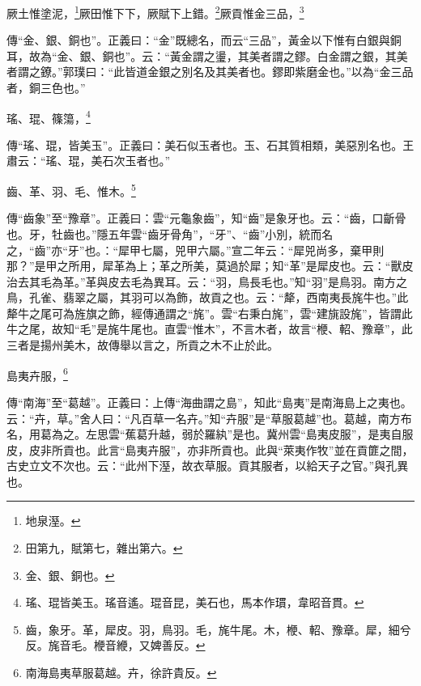 厥土惟塗泥，\footnote{地泉溼。}厥田惟下下，厥賦下上錯。\footnote{田第九，賦第七，雜出第六。}厥貢惟金三品，\footnote{金、銀、銅也。}

{\noindent\zhuan{}\fzbyks 傳“金、銀、銅也”。正義曰：“金”既總名，而云“三品”，黃金以下惟有白銀與銅耳，故為“金、銀、銅也”。云：“黃金謂之璗，其美者謂之鏐。白金謂之銀，其美者謂之鐐。”郭璞曰：“此皆道金銀之別名及其美者也。鏐即紫磨金也。”以為“金三品者，銅三色也。” \par}

瑤、琨、篠簜，\footnote{瑤、琨皆美玉。瑤音遙。琨音昆，美石也，馬本作瑻，韋昭音貫。}

{\noindent\zhuan{}\fzbyks 傳“瑤、琨，皆美玉”。正義曰：美石似玉者也。玉、石其質相類，美惡別名也。王肅云：“瑤、琨，美石次玉者也。” \par}

齒、革、羽、毛、惟木。\footnote{齒，象牙。革，犀皮。羽，鳥羽。毛，旄牛尾。木，楩、軺、豫章。犀，細兮反。旄音毛。楩音緶，又婢善反。}

{\noindent\zhuan{}\fzbyks 傳“齒象”至“豫章”。正義曰：雲“元龜象齒”，知“齒”是象牙也。云：“齒，口齗骨也。牙，牡齒也。”隱五年雲“齒牙骨角”，“牙”、“齒”小別，統而名之，“齒”亦“牙”也。：“犀甲七屬，兕甲六屬。”宣二年云：“犀兕尚多，棄甲則那？”是甲之所用，犀革為上；革之所美，莫過於犀；知“革”是犀皮也。云：“獸皮治去其毛為革。”革與皮去毛為異耳。云：“羽，鳥長毛也。”知“羽”是鳥羽。南方之鳥，孔雀、翡翠之屬，其羽可以為飾，故貢之也。云：“犛，西南夷長旄牛也。”此犛牛之尾可為旌旗之飾，經傳通謂之“旄”。雲“右秉白旄”，雲“建旐設旄”，皆謂此牛之尾，故知“毛”是旄牛尾也。直雲“惟木”，不言木者，故言“楩、軺、豫章”，此三者是揚州美木，故傳舉以言之，所貢之木不止於此。 \par}

島夷卉服，\footnote{南海島夷草服葛越。卉，徐許貴反。}

{\noindent\zhuan{}\fzbyks 傳“南海”至“葛越”。正義曰：上傳“海曲謂之島”，知此“島夷”是南海島上之夷也。云：“卉，草。”舍人曰：“凡百草一名卉。”知“卉服”是“草服葛越”也。葛越，南方布名，用葛為之。左思雲“蕉葛升越，弱於羅紈”是也。冀州雲“島夷皮服”，是夷自服皮，皮非所貢也。此言“島夷卉服”，亦非所貢也。此與“萊夷作牧”並在貢篚之間，古史立文不次也。云：“此州下溼，故衣草服。貢其服者，以給天子之官。”與孔異也。 \par}

